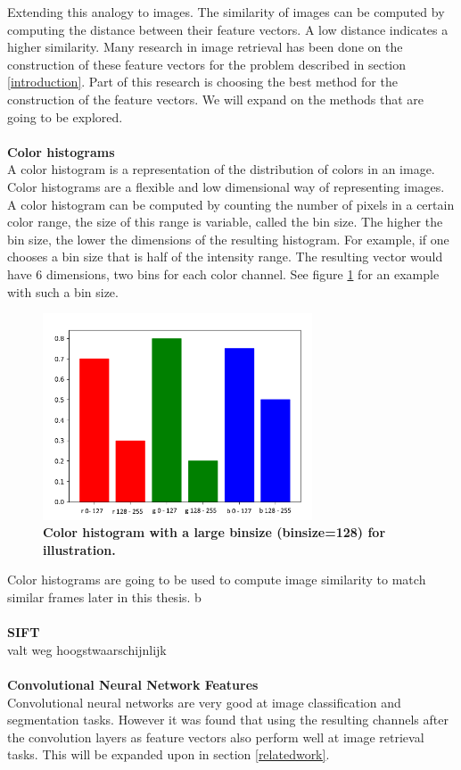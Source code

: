 \documentclass{article}
\begin{document}
Extending this analogy to images. The similarity of images can be computed by computing the distance between their feature vectors. A low distance indicates a higher similarity. Many research in image retrieval has been done on the construction of these feature vectors for the problem described in section \ref{introduction}. Part of this research is choosing the best  method for the construction of the feature vectors. We will expand on the methods that are going to be explored.
\\\\
\textbf{Color histograms}\\
A color histogram is a representation of the distribution of colors in an image. Color histograms are a flexible and low dimensional way of representing images. A color histogram can be computed by counting the number of pixels in a certain color range, the size of this range is variable, called the bin size. The higher the bin size, the lower the dimensions of the resulting histogram. For example, if one chooses a bin size that is half of the intensity range. The resulting vector would have 6 dimensions, two bins for each color channel. See figure \ref{fig:colorhistogram} for an example with such a bin size.
\begin{figure}[H]
	\includegraphics[width=8cm]{images/colorhistogram.png}
	\centering
	\caption{\textbf{Color histogram with a large binsize (binsize=128) for illustration.}}
	\label{fig:colorhistogram}
\end{figure}
Color histograms are going to be used to compute image similarity to match similar frames later in this thesis. b
\\ \\
\textbf{SIFT}\\
valt weg hoogstwaarschijnlijk
\\ \\
\textbf{Convolutional Neural Network Features} \\
Convolutional neural networks are very good at image classification and segmentation tasks. However it was found that using the resulting channels after the convolution layers as feature vectors also perform well at image retrieval tasks. This will be expanded upon in section \ref{relatedwork}.
\end{document}
